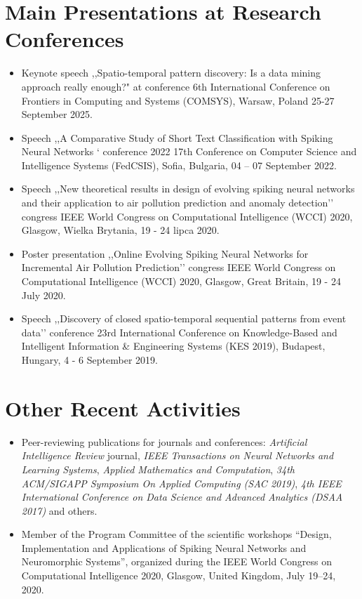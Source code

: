 \documentclass[10pt,a4paper,sans]{moderncv}        %
\begin{document}
\section{Main Presentations at Research Conferences}
\vspace{6pt}

\begin{itemize}
\item Keynote speech ,,Spatio-temporal pattern discovery: Is a data mining approach really enough?" at conference 6th International Conference on Frontiers in Computing and Systems (COMSYS), Warsaw, Poland 25-27 September 2025. 
\item Speech ,,A Comparative Study of Short Text Classification with Spiking Neural Networks ‘ conference 2022 17th Conference on Computer Science and Intelligence Systems (FedCSIS), Sofia, Bulgaria, 04 – 07 September 2022.
\item Speech ,,New theoretical results in design of evolving spiking neural networks and their application to air pollution prediction and anomaly detection’’ congress IEEE World Congress on Computational Intelligence (WCCI) 2020, Glasgow, Wielka Brytania, 19 - 24 lipca 2020.
\item Poster presentation ,,Online Evolving Spiking Neural Networks for Incremental Air Pollution Prediction’’ congress IEEE World Congress on Computational Intelligence (WCCI) 2020, Glasgow, Great Britain, 19 - 24 July 2020.
\item Speech ,,Discovery of closed spatio-temporal sequential patterns from event data’’ conference 23rd International Conference on Knowledge-Based and Intelligent Information \& Engineering Systems (KES 2019), Budapest, Hungary, 4 - 6 September 2019.
\end{itemize}

\section{Other Recent Activities}
\vspace{6pt}

\begin{itemize}
    \item Peer-reviewing publications for journals and conferences: \textit{Artificial Intelligence Review} journal, \textit{IEEE Transactions on Neural Networks and Learning Systems}, \textit{Applied Mathematics and Computation}, \textit{34th ACM/SIGAPP Symposium On Applied Computing (SAC 2019)}, \textit{4th IEEE International Conference on Data Science and Advanced Analytics (DSAA 2017)} and others.

    \item Member of the Program Committee of the scientific workshops “Design, Implementation and Applications of Spiking Neural Networks and Neuromorphic Systems”, organized during the IEEE World Congress on Computational Intelligence 2020, Glasgow, United Kingdom, July 19–24, 2020.
\end{itemize}
\end{document}
